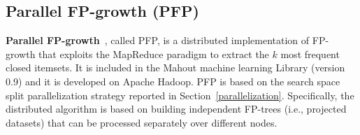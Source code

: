 \subsection{Parallel FP-growth (PFP)}
\label{FP-Growth}
{\bf Parallel FP-growth}~\cite{pfpgrowth}, called PFP, is a distributed implementation of FP-growth
that exploits the MapReduce paradigm to extract the $k$ most frequent closed
itemsets. It is included in the Mahout machine learning Library (version 0.9)
and it is developed on Apache Hadoop. 
PFP is based on the search space split parallelization strategy reported in Section~\ref{parallelization}. 
Specifically, the distributed algorithm is based on building independent FP-trees (i.e., projected datasets) that can be processed separately
over different nodes.


